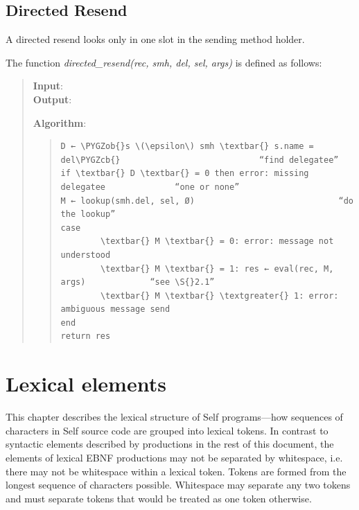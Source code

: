 \documentclass[letterpaper,10pt,english]{sphinxmanual}
\def\PYGZob{\char`\{}
\def\PYGZcb{\char`\}}
\begin{document}
\subsection{Directed Resend}
\label{langref:directed-resend}
A directed resend looks only in one slot in the sending method holder.

The function \emph{directed\_resend(rec, smh, del, sel, args)} is defined as follows:
\begin{quote}
\begin{description}
\item[{\textbf{Input}:}] \leavevmode
{}

\item[{\textbf{Output}:}] \leavevmode
{}

\end{description}

\textbf{Algorithm}:
\begin{quote}

\begin{Verbatim}[commandchars=\\\{\}]
D ← \PYGZob{}s \(\epsilon\) smh \textbar{} s.name = del\PYGZcb{}                            “find delegatee”
if \textbar{} D \textbar{} = 0 then error: missing delegatee              “one or none”
M ← lookup(smh.del, sel, Ø)                             “do the lookup”
case
        \textbar{} M \textbar{} = 0: error: message not understood
        \textbar{} M \textbar{} = 1: res ← eval(rec, M, args)             “see \S{}2.1”
        \textbar{} M \textbar{} \textgreater{} 1: error: ambiguous message send
end
return res
\end{Verbatim}
\end{quote}
\end{quote}


\section{Lexical elements}
\label{langref:lexical-elements}
This chapter describes the lexical structure of Self programs—how sequences of characters in Self source code are grouped into lexical tokens. In contrast to syntactic elements described by productions in the rest of this document, the elements of lexical EBNF productions may not be separated by whitespace, i.e. there may not be whitespace within a lexical token. Tokens are formed from the longest sequence of characters possible. Whitespace may separate any two tokens and must separate tokens that would be treated as one token otherwise.
\end{document}
